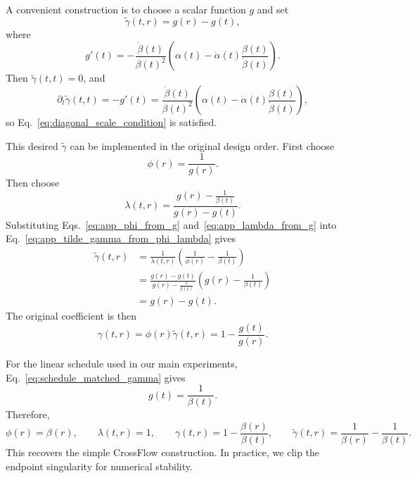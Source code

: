 A convenient construction is to choose a scalar function $g$ and set
\begin{equation}
\tilde{\gamma}(t,r)
=
g(r)-g(t),
\label{eq:app_tilde_gamma_g_difference}
\end{equation}
where
\begin{equation}
g'(t)
=
-\frac{\dot\beta(t)}{\beta(t)^2}
\left(
\alpha(t)-\dot\alpha(t)\frac{\beta(t)}{\dot\beta(t)}
\right).
\label{eq:schedule_matched_gamma}
\end{equation}
Then $\tilde{\gamma}(t,t)=0$, and
\begin{equation}
\partial_t\tilde{\gamma}(t,t)
=
-g'(t)
=
\frac{\dot\beta(t)}{\beta(t)^2}
\left(
\alpha(t)-\dot\alpha(t)\frac{\beta(t)}{\dot\beta(t)}
\right),
\end{equation}
so Eq.~\eqref{eq:diagonal_scale_condition} is satisfied.

This desired $\tilde{\gamma}$ can be implemented in the original design order. First choose
\begin{equation}
\phi(r)=\frac{1}{g(r)} .
\label{eq:app_phi_from_g}
\end{equation}
Then choose
\begin{equation}
\lambda(t,r)
=
\frac{
g(r)-\frac{1}{\beta(t)}
}{
g(r)-g(t)
}.
\label{eq:app_lambda_from_g}
\end{equation}
Substituting Eqs.~\eqref{eq:app_phi_from_g} and~\eqref{eq:app_lambda_from_g} into Eq.~\eqref{eq:app_tilde_gamma_from_phi_lambda} gives
\begin{equation}
\begin{aligned}
\tilde{\gamma}(t,r)
&=
\frac{1}{\lambda(t,r)}
\left(
\frac{1}{\phi(r)}
-
\frac{1}{\beta(t)}
\right) \\
&=
\frac{g(r)-g(t)}
{g(r)-\frac{1}{\beta(t)}}
\left(
g(r)
-
\frac{1}{\beta(t)}
\right) \\
&=
g(r)-g(t).
\end{aligned}
\label{eq:app_tilde_gamma_recovered}
\end{equation}
The original coefficient is then
\begin{equation}
\gamma(t,r)
=
\phi(r)\tilde{\gamma}(t,r)
=
1-\frac{g(t)}{g(r)} .
\label{eq:app_original_gamma_from_g}
\end{equation}

For the linear schedule used in our main experiments, Eq.~\eqref{eq:schedule_matched_gamma} gives
\begin{equation}
g(t)=\frac{1}{\beta(t)} .
\end{equation}
Therefore,
\begin{equation}
\phi(r)=\beta(r),
\qquad
\lambda(t,r)=1,
\qquad
\gamma(t,r)=1-\frac{\beta(r)}{\beta(t)},
\qquad
\tilde{\gamma}(t,r)=\frac{1}{\beta(r)}-\frac{1}{\beta(t)} .
\end{equation}
This recovers the simple CrossFlow construction. In practice, we clip the endpoint singularity for numerical stability.

